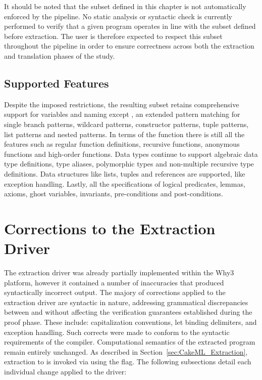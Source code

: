 It should be noted that the subset defined in this chapter is not automatically enforced by the pipeline. No static analysis or syntactic check is currently performed to verify 
that a given \whyml program operates in line with the subset defined before extraction. The user is therefore expected to respect this subset throughout the pipeline in order 
to ensure correctness across both the extraction and translation phases of the study.

\subsection{Supported Features}

Despite the imposed restrictions, the resulting subset retains comprehensive support for variables and naming except ,
an extended pattern matching for single branch patterns, wildcard patterns, constructor patterns, tuple patterns, list
patterns and nested patterns. In terms of the function there is still all the \whyml features such as regular function definitions,
recursive functions, anonymous functions and high-order functions. Data types continue to support algebraic data type definitions,
type aliases, polymorphic types and non-multiple recursive type definitions. Data structures like lists, tuples and references are supported,
like exception handling. Lastly, all the specifications of logical predicates, lemmas, axioms, ghost variables, invariants, pre-conditions and
post-conditions.

\section{Corrections to the \cml Extraction Driver}
\label{sec:Corrections_Cakeml}

The \cml extraction driver was already partially implemented within the Why3 platform, however it contained a number of inaccuracies that produced syntactically incorrect 
\cml output. The majory of corrections applied to the \cml extraction driver are syntactic in nature, addressing grammatical discrepancies between \whyml and \cml without
affecting the verification guarantees established during the proof phase. These include: capitalization conventions, let binding delimiters, and exception handling. Such
corrects were made to conform to the syntactic requirements of the \cml compiler. Computational semantics of the extracted program remain entirely unchanged. As described
in Section~\ref{sec:CakeML_Extraction}, extraction to \cml is invoked via \cameleer using the  flag. The following subsections detail each individual
change applied to the driver:

